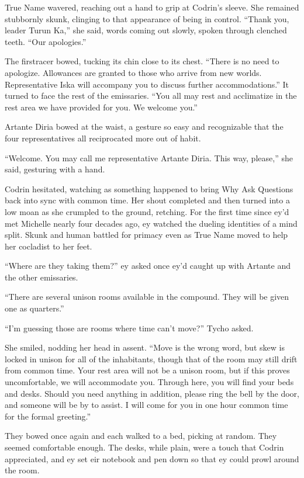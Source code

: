 True Name wavered, reaching out a hand to grip at Codrin's sleeve. She remained stubbornly skunk, clinging to that appearance of being in control. ``Thank you, leader Turun Ka,'' she said, words coming out slowly, spoken through clenched teeth. ``Our apologies.''

The firstracer bowed, tucking its chin close to its chest. ``There is no need to apologize. Allowances are granted to those who arrive from new worlds. Representative Iska will accompany you to discuss further accommodations.'' It turned to face the rest of the emissaries. ``You all may rest and acclimatize in the rest area we have provided for you. We welcome you.''

Artante Diria bowed at the waist, a gesture so easy and recognizable that the four representatives all reciprocated more out of habit.

``Welcome. You may call me representative Artante Diria. This way, please,'' she said, gesturing with a hand.

Codrin hesitated, watching as something happened to bring Why Ask Questions back into sync with common time. Her shout completed and then turned into a low moan as she crumpled to the ground, retching. For the first time since ey'd met Michelle nearly four decades ago, ey watched the dueling identities of a mind split. Skunk and human battled for primacy even as True Name moved to help her cocladist to her feet.

``Where are they taking them?'' ey asked once ey'd caught up with Artante and the other emissaries.

``There are several unison rooms available in the compound. They will be given one as quarters.''

``I'm guessing those are rooms where time can't move?'' Tycho asked.

She smiled, nodding her head in assent. ``Move is the wrong word, but skew is locked in unison for all of the inhabitants, though that of the room may still drift from common time. Your rest area will not be a unison room, but if this proves uncomfortable, we will accommodate you. Through here, you will find your beds and desks. Should you need anything in addition, please ring the bell by the door, and someone will be by to assist. I will come for you in one hour common time for the formal greeting.''

They bowed once again and each walked to a bed, picking at random. They seemed comfortable enough. The desks, while plain, were a touch that Codrin appreciated, and ey set eir notebook and pen down so that ey could prowl around the room.

